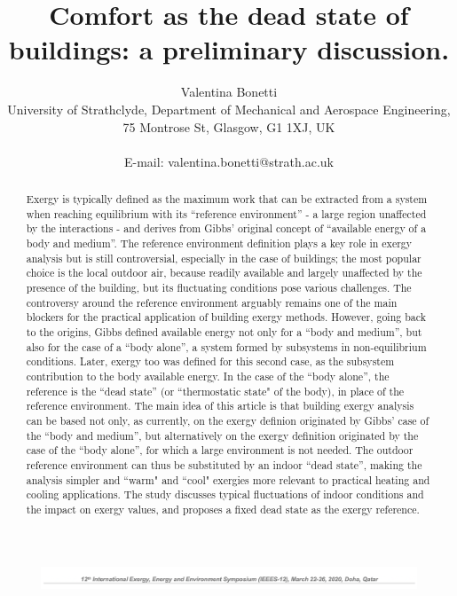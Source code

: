 \documentclass[10pt]{extarticle} %
\title{Comfort as the dead state of buildings: a preliminary discussion.}
\author{Valentina Bonetti\\ University of Strathclyde, Department of Mechanical and Aerospace Engineering, 75 Montrose St, Glasgow, G1 1XJ,  UK\\ \\ E-mail: valentina.bonetti@strath.ac.uk}
\date{}
\begin{document}
\renewcommand{\abstractname}{Abstract:}



\begin{figure}[!h]
\centering
\includegraphics[width=6.8in, center]{images/articleHeading1.png}
\end{figure}

\let\newpage\relax
\vspace*{-2cm}
\maketitle
\vspace*{-1cm}


\begin{abstract}

\noindent Exergy is typically defined as the maximum work that can be extracted from a system when reaching equilibrium with its ``reference environment'' - a large region unaffected by the interactions - and derives from Gibbs' original concept of ``available energy of a body and medium''. The reference environment definition  plays a key role in exergy analysis but is still controversial, especially in the case of buildings; the most popular choice is the local outdoor air, because readily available and largely unaffected by the presence of the building, but its fluctuating conditions pose various challenges. The controversy around the reference environment arguably remains one of the main blockers for the practical application of building exergy methods.
However, going back to the origins, Gibbs defined available energy not only for a ``body and medium'', but also for the case of a ``body alone'', a system formed by subsystems in non-equilibrium conditions. Later, exergy too was defined for this second case, as the subsystem contribution to the body available energy. In the case of the ``body alone'', the reference is the ``dead state'' (or ``thermostatic state" of the body), in place of the reference environment. 
The main idea of this article is that building exergy analysis can be based not only, as currently, on the exergy definion originated by Gibbs' case of the ``body and medium'', but alternatively on the exergy definition originated by the case of the  ``body alone'', for which a large environment is not needed.  The outdoor reference environment can thus be substituted by an indoor ``dead state'', making the analysis simpler and ``warm" and ``cool" exergies more relevant to practical heating and cooling applications. The study discusses typical fluctuations of indoor conditions and the impact on exergy values, and proposes a fixed dead state as the exergy reference.

\end{abstract}
\end{document}
